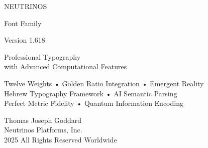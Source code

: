 \documentclass[11pt,letterpaper]{article}
\begin{document}

\begin{titlepage}
\centering
\vspace*{0.5cm}

{\blackfont\Huge\color{quantumgold}
NEUTRINOS\\[10pt]
}

{\blackfont\LARGE\color{neutrinoblue}
Font Family\\[5pt]
}

{\semiboldfont\Large\color{darkenergy}
Version 1.618\\[20pt]
}


\vspace{20pt}

{\mediumfont\Large\color{spacetimeblack}
Professional Typography\\
with Advanced Computational Features\\[40pt]
}

{\lightfont\large
Twelve Weights • Golden Ratio Integration • Emergent Reality\\
Hebrew Typography Framework • AI Semantic Parsing\\
Perfect Metric Fidelity • Quantum Information Encoding\\[20pt]
}

\vfill

{\mediumfont\color{darkongray}
Thomas Joseph Goddard\\
Neutrinos Platforms, Inc.\\[10pt]
\textcopyright{} 2025 All Rights Reserved Worldwide
}

\end{titlepage}
\end{document}
